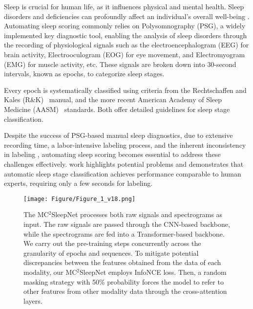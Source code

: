 Sleep is crucial for human life, as it influences physical and mental health. Sleep disorders and deficiencies can profoundly affect an individual's overall well-being \cite{wulff2010sleep}.
%
Automating sleep scoring commonly relies on Polysomnography (PSG), a widely implemented key diagnostic tool, enabling the analysis of sleep disorders through the recording of physiological signals such as the electroencephalogram (EEG) for brain activity, Electrooculogram (EOG) for eye movement, and Electromyogram (EMG) for muscle activity, etc. 
%
These signals are broken down into 30-second intervals, known as epochs, to categorize sleep stages.

Every epoch is systematically classified using criteria from the Rechtschaffen and Kales (R\&K)~\cite{rechtschaffen1968manual} manual, and the more recent American Academy of Sleep Medicine (AASM)~\cite{berry2012aasm} standards. Both offer detailed guidelines for sleep stage classification.


Despite the success of PSG-based manual sleep diagnostics, due to extensive recording time, a labor-intensive labeling process, and the inherent inconsistency in labeling \cite{chapotot2010automated}, automating sleep scoring becomes essential to address these challenges effectively. \cite{10.5665/sleep.2548} work highlights potential problems and demonstrates that automatic sleep stage classification achieves performance comparable to human experts, requiring only a few seconds for labeling. 


\begin{figure*}[htb]
\centerline{\texttt{[image: Figure/Figure\_1\_v18.png]}
}

\caption{ 
%
The MC$^2$SleepNet processes both raw signals and spectrograms as input. The raw signals are passed through the CNN-based backbone, while the spectrograms are fed into a Transformer-based backbone.
%
We carry out the pre-training steps concurrently across the granularity of epochs and sequences. To mitigate potential discrepancies between the features obtained from the data of each modality, our MC$^2$SleepNet employs InfoNCE loss.
%
Then, a random masking strategy with 50\% probability forces the model to refer to other features from other modality data through the cross-attention layers.
} 

\label{fig1}
\vspace{-5pt}
\end{figure*}

